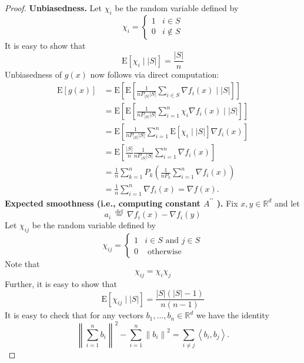 \documentclass[12pt,a4paper]{article}
\begin{document}
\begin{proof}
	\textbf{Unbiasedness.}  Let $\chi_{i}$ be the random variable defined by
	$$
	\chi_{i}= \begin{cases}1 & i \in S \\ 0 & i \notin S\end{cases}
	$$
	It is easy to show that
	$$
	\mathrm{E}\left[\chi_{i}\mid |S|\right]=\frac{|S|}{n}
	$$
	Unbiasedness of $g(x)$ now follows via direct computation:
	$$
	\begin{aligned}
		\mathrm{E}[g(x)] & \stackrel{}{=}\mathrm{E}\left[ \mathrm{E}\left[\frac{1}{nP_{|S|}|S|} \sum_{i \in S} \nabla f_{i}(x)\mid |S|\right]\right]\\
		&=\mathrm{E}\left[\mathrm{E}\left[\frac{1}{nP_{|S|}|S|} \sum_{i=1}^{n} \chi_{i} \nabla f_{i}(x)\mid |S|\right] \right]\\
		&=\mathrm{E}\left[\frac{1}{nP_{|S|}|S|}\sum_{i=1}^{n}\mathrm{E}\left[\chi_{i}\mid |S|\right]\nabla f_i(x)\right]\\
		&=\mathrm{E}\left[\frac{|S|}{n}\frac{1}{nP_{|S|}|S|}\sum_{i=1}^{n}\nabla f_i(x)\right]\\
		&=\frac{1}{n}\sum_{k=1}^{n}P_{k}\left(\frac{1}{nP_{k}}\sum_{i=1}^{n}\nabla f_i(x)\right)\\
		&=\frac{1}{n}\sum_{i=1}^{n}\nabla f_{i}(x)=\nabla f(x).
	\end{aligned}
	$$
	\textbf{Expected smoothness (i.e., computing constant $A^{\prime \prime}$ ).} Fix $x, y \in \mathbb{R}^{d}$ and let
	$$
	a_{i} \stackrel{\text { def }}{=} \nabla f_{i}(x)-\nabla f_{i}(y)
	$$
	Let $\chi_{i j}$ be the random variable defined by
	$$
	\chi_{i j}= \begin{cases}1 & i \in S \text { and } j \in S \\ 0 & \text { otherwise }\end{cases}
	$$
	Note that
	$$
	\chi_{i j}=\chi_{i} \chi_{j}
	$$
	Further, it is easy to show that
	$$
	\mathrm{E}\left[\chi_{i j}\mid |S|\right]=\frac{|S|(|S|-1)}{n(n-1)}
	$$
	It is easy to check that for any vectors $b_{1}, \ldots, b_{n} \in \mathbb{R}^{d}$ we have the identity
	$$
	\left\|\sum_{i=1}^{n} b_{i}\right\|^{2}-\sum_{i=1}^{n}\left\|b_{i}\right\|^{2}=\sum_{i \neq j}\left\langle b_{i}, b_{j}\right\rangle.
	$$
	

\end{proof}
\end{document}
